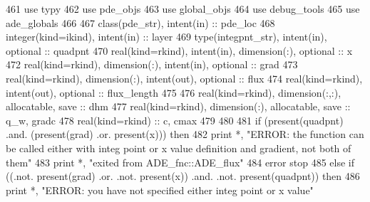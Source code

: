 \begin{DoxyCode}
461       \textcolor{keywordtype}{use }typy
462       \textcolor{keywordtype}{use }pde_objs
463       \textcolor{keywordtype}{use }global_objs
464       \textcolor{keywordtype}{use }debug_tools
465       \textcolor{keywordtype}{use }ade_globals
466        
467       \textcolor{keywordtype}{class}(pde_str), \textcolor{keywordtype}{intent(in)} :: pde\_loc
468       \textcolor{keywordtype}{integer(kind=ikind)}, \textcolor{keywordtype}{intent(in)}                          :: layer
469       \textcolor{keywordtype}{type}(integpnt_str), \textcolor{keywordtype}{intent(in)}, \textcolor{keywordtype}{optional} :: quadpnt    
470       \textcolor{keywordtype}{real(kind=rkind)}, \textcolor{keywordtype}{intent(in)}, \textcolor{keywordtype}{dimension(:)}, \textcolor{keywordtype}{optional}              \textcolor{comment}{     :: x}
472       \textcolor{keywordtype}{real(kind=rkind)}, \textcolor{keywordtype}{dimension(:)}, \textcolor{keywordtype}{intent(in)}, \textcolor{keywordtype}{optional}     :: grad
473       \textcolor{keywordtype}{real(kind=rkind)}, \textcolor{keywordtype}{dimension(:)}, \textcolor{keywordtype}{intent(out)}, \textcolor{keywordtype}{optional}    :: flux
474       \textcolor{keywordtype}{real(kind=rkind)}, \textcolor{keywordtype}{intent(out)}, \textcolor{keywordtype}{optional}                  :: flux\_length
475     
476       \textcolor{keywordtype}{real(kind=rkind)}, \textcolor{keywordtype}{dimension(:,:)}, \textcolor{keywordtype}{allocatable}, \textcolor{keywordtype}{save}  :: dhm
477       \textcolor{keywordtype}{real(kind=rkind)}, \textcolor{keywordtype}{dimension(:)}, \textcolor{keywordtype}{allocatable}, \textcolor{keywordtype}{save} :: q\_w, gradc
478       \textcolor{keywordtype}{real(kind=rkind)} :: c, cmax
479       
480       
481       \textcolor{keywordflow}{if} (\textcolor{keyword}{present}(quadpnt) .and. (\textcolor{keyword}{present}(grad) .or. \textcolor{keyword}{present}(x))) \textcolor{keywordflow}{then}
482         print *, \textcolor{stringliteral}{"ERROR: the function can be called either with integ point or x value definition and
       gradient, not both of them"}
483         print *, \textcolor{stringliteral}{"exited from ADE\_fnc::ADE\_flux"}
484         error stop
485       \textcolor{keywordflow}{else} \textcolor{keywordflow}{if} ((.not. \textcolor{keyword}{present}(grad) .or. .not. \textcolor{keyword}{present}(x)) .and. .not. \textcolor{keyword}{present}\textcolor{comment}{(quadpnt)) }\textcolor{keywordflow}{then}
486         print *, \textcolor{stringliteral}{"ERROR: you have not specified either integ point or x value"}

\end{DoxyCode}
